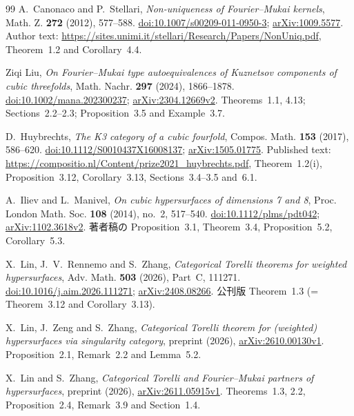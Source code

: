 \begin{thebibliography}{99}
A.~Canonaco and P.~Stellari,
\emph{Non-uniqueness of Fourier--Mukai kernels},
Math. Z. \textbf{272} (2012), 577--588.
\href{https://doi.org/10.1007/s00209-011-0950-3}{doi:10.1007/s00209-011-0950-3};
\href{https://arxiv.org/abs/1009.5577}{arXiv:1009.5577}.
Author text: \url{https://sites.unimi.it/stellari/Research/Papers/NonUniq.pdf},
Theorem~1.2 and Corollary~4.4.

Ziqi Liu,
\emph{On Fourier--Mukai type autoequivalences of Kuznetsov components of cubic threefolds},
Math. Nachr. \textbf{297} (2024), 1866--1878.
\href{https://doi.org/10.1002/mana.202300237}{doi:10.1002/mana.202300237};
\href{https://arxiv.org/abs/2304.12669v2}{arXiv:2304.12669v2}.
Theorems~1.1, 4.13; Sections~2.2--2.3; Proposition~3.5 and Example~3.7.

D.~Huybrechts,
\emph{The K3 category of a cubic fourfold},
Compos. Math. \textbf{153} (2017), 586--620.
\href{https://doi.org/10.1112/S0010437X16008137}{doi:10.1112/S0010437X16008137};
\href{https://arxiv.org/abs/1505.01775}{arXiv:1505.01775}.
Published text: \url{https://compositio.nl/Content/prize2021_huybrechts.pdf},
Theorem~1.2(i), Proposition~3.12, Corollary~3.13, Sections~3.4--3.5 and~6.1.

A.~Iliev and L.~Manivel,
\emph{On cubic hypersurfaces of dimensions 7 and 8},
Proc. London Math. Soc. \textbf{108} (2014), no.~2, 517--540.
\href{https://doi.org/10.1112/plms/pdt042}{doi:10.1112/plms/pdt042};
\href{https://arxiv.org/abs/1102.3618v2}{arXiv:1102.3618v2}.
著者稿の Proposition~3.1, Theorem~3.4, Proposition~5.2, Corollary~5.3.

X.~Lin, J.~V.~Rennemo and S.~Zhang,
\emph{Categorical Torelli theorems for weighted hypersurfaces},
Adv. Math. \textbf{503} (2026), Part~C, 111271.
\href{https://doi.org/10.1016/j.aim.2026.111271}{doi:10.1016/j.aim.2026.111271};
\href{https://arxiv.org/abs/2408.08266}{arXiv:2408.08266}.
公刊版 Theorem~1.3 (= Theorem~3.12 and Corollary~3.13).

X.~Lin, J.~Zeng and S.~Zhang,
\emph{Categorical Torelli theorem for (weighted) hypersurfaces via singularity category},
preprint (2026),
\href{https://arxiv.org/abs/2610.00130v1}{arXiv:2610.00130v1}.
Proposition~2.1, Remark~2.2 and Lemma~5.2.

X.~Lin and S.~Zhang,
\emph{Categorical Torelli and Fourier--Mukai partners of hypersurfaces},
preprint (2026),
\href{https://arxiv.org/abs/2611.05915v1}{arXiv:2611.05915v1}.
Theorems~1.3, 2.2, Proposition~2.4, Remark~3.9 and Section~1.4.



\end{thebibliography}
